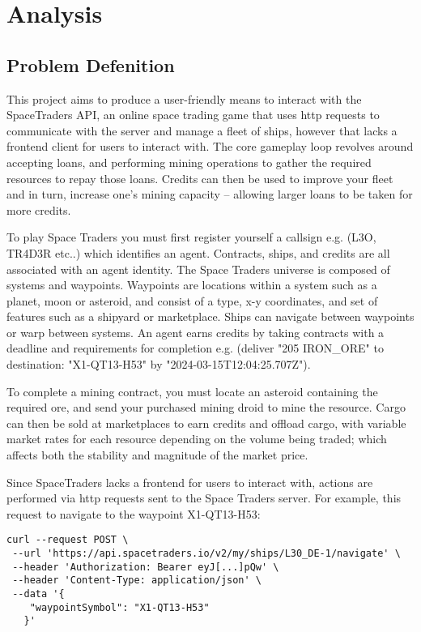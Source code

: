 \section{Analysis}
\subsection{Problem Defenition}
This project aims to produce a user-friendly means to interact with the SpaceTraders API, an online space trading game that uses http requests to communicate with the server and manage a fleet of ships, however that lacks a frontend client for users to interact with. The core gameplay loop revolves around accepting loans, and performing mining operations to gather the required resources to repay those loans. Credits can then be used to improve your fleet and in turn, increase one's mining capacity – allowing larger loans to be taken for more credits.

To play Space Traders you must first register yourself a callsign e.g. (L3O, TR4D3R etc..) which identifies an agent. Contracts, ships, and credits are all associated with an agent identity. The Space Traders universe is composed of systems and waypoints. Waypoints are locations within a system such as a planet, moon or asteroid, and consist of a type, x-y coordinates, and set of features such as a shipyard or marketplace. Ships can navigate between waypoints or warp between systems. An agent earns credits by taking contracts with a deadline and requirements for completion e.g. (deliver "205 IRON\_ORE" to destination: "X1-QT13-H53" by "2024-03-15T12:04:25.707Z"). 

To complete a mining contract, you must locate an asteroid containing the required ore, and send your purchased mining droid to mine the resource. Cargo can then be sold at marketplaces to earn credits and offload cargo, with variable market rates for each resource depending on the volume being traded; which affects both the stability and magnitude of the market price. 

Since SpaceTraders lacks a frontend for users to interact with, actions are performed via http requests sent to the Space Traders server. For example, this request to navigate to the waypoint X1-QT13-H53:
\begin{lstlisting}
curl --request POST \
 --url 'https://api.spacetraders.io/v2/my/ships/L30_DE-1/navigate' \
 --header 'Authorization: Bearer eyJ[...]pQw' \
 --header 'Content-Type: application/json' \
 --data '{
    "waypointSymbol": "X1-QT13-H53"
   }'
\end{lstlisting}

